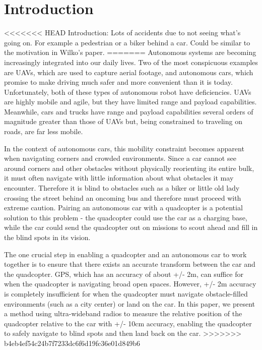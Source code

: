 
\section{Introduction}

<<<<<<< HEAD
Introduction: Lots of accidents due to not seeing what's going on. For example a pedestrian or a biker behind a car. Could be similar to the motivation in Wilko's paper.
=======
Autonomous systems are becoming increasingly integrated into
our daily lives. Two of the most conspicuous examples are UAVs,
which are used to capture aerial footage, and autonomous cars,
which promise to make driving much safer and more convenient
than it is today. Unfortunately, both of these types of autonomous
robot have deficiencies. UAVs are highly mobile and agile, but they
have limited range and payload capabilities. Meanwhile, cars and trucks
have range and payload capabilities several orders of magnitude greater than
those of UAVs but, being constrained to traveling on roads, are far less mobile.

In the context of autonomous cars, this mobility constraint becomes apparent
when navigating corners and crowded environments. Since a car cannot
see around corners and other obstacles without physically reorienting its
entire bulk, it must often navigate with little information about what obstacles
it may encounter. Therefore it is blind to obstacles such as a biker or little old
lady crossing the street behind an oncoming bus and therefore must proceed
with extreme caution. Pairing an autonomous car with a quadcopter is a potential
solution to this problem - the quadcopter could use the car as a charging base,
while the car could send the quadcopter out on missions to scout ahead and
fill in the blind spots in its vision.

The one crucial step in enabling a quadcopter and an autonomous car to work
together is to ensure that there exists an accurate transform between the car
and the quadcopter. GPS, which has an accuracy of about +/- 2m, can suffice
for when the quadcopter is navigating broad open spaces. However, +/- 2m
accuracy is completely insufficient for when the quadcopter must navigate
obstacle-filled environments (such as a city center) or land on the car. In this 
paper, we present a method using ultra-wideband radios to measure the relative 
position of the quadcopter relative to the car with +/- 10cm accuracy, enabling 
the quadcopter to safely navigate to blind spots and then land back on the car.
>>>>>>> b4eb4ef54c24b7f7233dc6f6d19fc36e01d849b6

